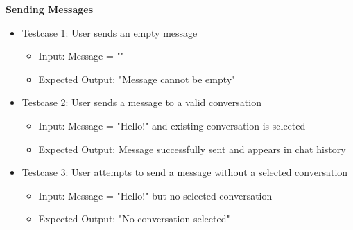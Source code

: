 \textbf{Sending Messages}
\begin{itemize}
    \item Testcase 1: User sends an empty message
    \begin{itemize}
        \item Input: Message = ""
        \item Expected Output: "Message cannot be empty"
    \end{itemize}

    \item Testcase 2: User sends a message to a valid conversation
    \begin{itemize}
        \item Input: Message = "Hello!" and existing conversation is selected
        \item Expected Output: Message successfully sent and appears in chat history
    \end{itemize}

    \item Testcase 3: User attempts to send a message without a selected conversation
    \begin{itemize}
        \item Input: Message = "Hello!" but no selected conversation
        \item Expected Output: "No conversation selected"
    \end{itemize}
\end{itemize}

